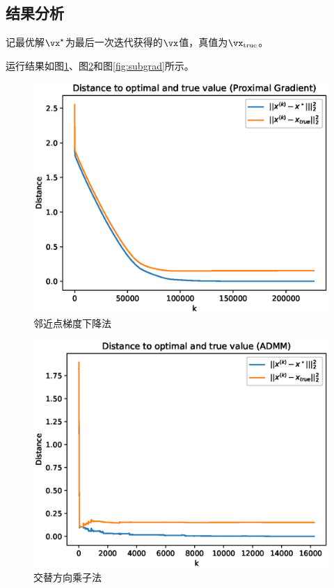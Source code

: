 \documentclass[logo,reportComp]{thesis}
\begin{document}
\subsection{结果分析}
记最优解$\vx^\star$为最后一次迭代获得的$\vx$值，真值为$\vx_{\text{true}}$。

运行结果如图\ref{fig:proxgrad}、图\ref{fig:admm}和图\ref{fig:subgrad}所示。

\begin{minipage}{0.5\linewidth}
\begin{figure}[H]
\centering
\includegraphics[width=\linewidth]{fig/proxgrad.eps}
\caption{邻近点梯度下降法}
\label{fig:proxgrad}
\end{figure}
\end{minipage}
\begin{minipage}{0.5\linewidth}
\begin{figure}[H]
\centering
\includegraphics[width=\linewidth]{fig/admm.eps}
\caption{交替方向乘子法}
\label{fig:admm}
\end{figure}
\end{minipage}
\end{document}
